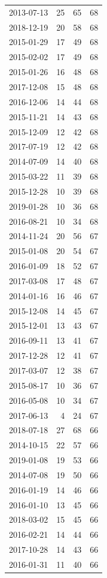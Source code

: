\begin{tabular}{lrrr}
2013-07-13 & 25 & 65 & 68 \\
2018-12-19 & 20 & 58 & 68 \\
2015-01-29 & 17 & 49 & 68 \\
2015-02-02 & 17 & 49 & 68 \\
2015-01-26 & 16 & 48 & 68 \\
2017-12-08 & 15 & 48 & 68 \\
2016-12-06 & 14 & 44 & 68 \\
2015-11-21 & 14 & 43 & 68 \\
2015-12-09 & 12 & 42 & 68 \\
2017-07-19 & 12 & 42 & 68 \\
2014-07-09 & 14 & 40 & 68 \\
2015-03-22 & 11 & 39 & 68 \\
2015-12-28 & 10 & 39 & 68 \\
2019-01-28 & 10 & 36 & 68 \\
2016-08-21 & 10 & 34 & 68 \\
2014-11-24 & 20 & 56 & 67 \\
2015-01-08 & 20 & 54 & 67 \\
2016-01-09 & 18 & 52 & 67 \\
2017-03-08 & 17 & 48 & 67 \\
2014-01-16 & 16 & 46 & 67 \\
2015-12-08 & 14 & 45 & 67 \\
2015-12-01 & 13 & 43 & 67 \\
2016-09-11 & 13 & 41 & 67 \\
2017-12-28 & 12 & 41 & 67 \\
2017-03-07 & 12 & 38 & 67 \\
2015-08-17 & 10 & 36 & 67 \\
2016-05-08 & 10 & 34 & 67 \\
2017-06-13 & 4 & 24 & 67 \\
2018-07-18 & 27 & 68 & 66 \\
2014-10-15 & 22 & 57 & 66 \\
2019-01-08 & 19 & 53 & 66 \\
2014-07-08 & 19 & 50 & 66 \\
2016-01-19 & 14 & 46 & 66 \\
2016-01-10 & 13 & 45 & 66 \\
2018-03-02 & 15 & 45 & 66 \\
2016-02-21 & 14 & 44 & 66 \\
2017-10-28 & 14 & 43 & 66 \\
2016-01-31 & 11 & 40 & 66 \\

\end{tabular}
